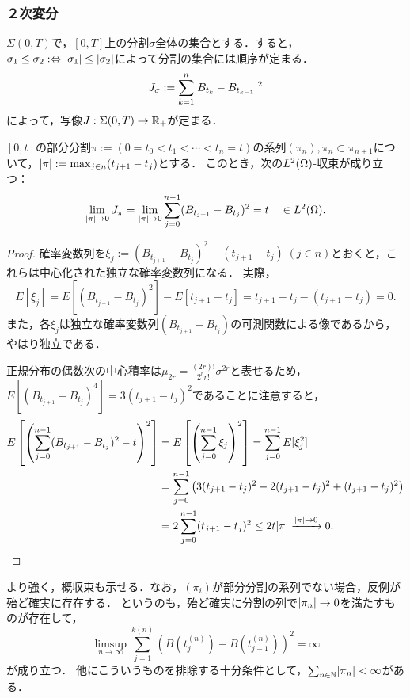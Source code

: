 \documentclass[uplatex,dvipdfmx]{jsreport}
\begin{document}
\subsubsection{２次変分}

\begin{notation}
    $\Sigma(0,T)$で，$[0,T]$上の分割$\sigma$全体の集合とする．すると，$\sigma_1\le\sigma_2:\Leftrightarrow\lvert\sigma_1\rvert\le\lvert\sigma_2\rvert$によって分割の集合には順序が定まる．
    \[J_\sigma:=\sum_{k=1}^n\lvert B_{t_k}-B_{t_{k-1}}\rvert^2\]
    によって，写像$J:\Sigma(0,T)\to\mathbb{R}_+$が定まる．
\end{notation}

\begin{proposition}[2次変動の$L^2$-収束]
    $[0,t]$の部分分割$\pi:=(0=t_0<t_1<\cdots<t_n=t)$の系列$(\pi_n),\pi_n\subset\pi_{n+1}$について，$\lvert\pi\rvert:=\max_{j\in n}(t_{j+1}-t_j)$とする．
    このとき，次の$L^2(\Omega)$-収束が成り立つ：
    \[\lim_{\lvert\pi\rvert\to0}J_\pi=\lim_{\lvert\pi\rvert\to0}\sum^{n-1}_{j=0}(B_{t_{j+1}}-B_{t_j})^2=t\quad\in L^2(\Omega).\]
\end{proposition}
\begin{proof}
    確率変数列を$\xi_j:=(B_{t_{j+1}}-B_{t_j})^2-(t_{j+1}-t_j)\;(j\in n)$とおくと，これらは中心化された独立な確率変数列になる．
    実際，
    \[E[\xi_j]=E[(B_{t_{j+1}}-B_{t_j})^2]-E[t_{j+1}-t_j]=t_{j+1}-t_j-(t_{j+1}-t_j)=0.\]
    また，各$\xi_j$は独立な確率変数列$(B_{t_{j+1}}-B_{t_j})$の可測関数による像であるから，やはり独立である．
    
    正規分布の偶数次の中心積率は$\mu_{2r}=\frac{(2r)!}{2^rr!}\sigma^{2r}$と表せるため，$E[(B_{t_{j+1}}-B_{t_j})^4]=3(t_{j+1}-t_j)^2$であることに注意すると，
    \begin{align*}
        E\left[\left(\sum^{n-1}_{j=0}(B_{t_{j+1}}-B_{t_j})^2-t\right)^2\right]&=E\left[\left(\sum^{n-1}_{j=0}\xi_j\right)^2\right]=\sum^{n-1}_{j=0}E[\xi^2_j]\\
        &=\sum^{n-1}_{j=0}\left(3(t_{j+1}-t_j)^2-2(t_{j+1}-t_j)^2+(t_{j+1}-t_j)^2\right)\\
        &=2\sum^{n-1}_{j=0}(t_{j+1}-t_j)^2\le 2t\lvert\pi\rvert\xrightarrow{\lvert\pi\rvert\to0}0.
    \end{align*}
\end{proof}
\begin{remark}
    より強く，概収束も示せる．なお，$(\pi_i)$が部分分割の系列でない場合，反例が殆ど確実に存在する．
    というのも，殆ど確実に分割の列で$\lvert\pi_n\rvert\to 0$を満たすものが存在して，
    \[\limsup_{n\to\infty}\sum^{k(n)}_{j=1}(B(t_j^{(n)})-B(t^{(n)}_{j-1}))^2=\infty\]
    が成り立つ．
    他にこういうものを排除する十分条件として，$\sum_{n\in\mathbb{N}}\lvert\pi_n\rvert<\infty$がある．
\end{remark}
\end{document}
